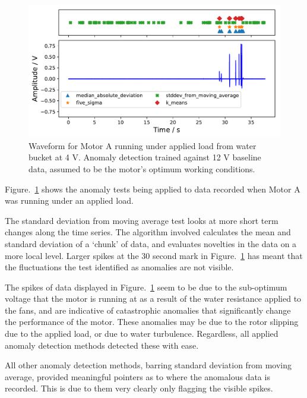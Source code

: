 \begin{figure}[t]
    \includegraphics[width=1.0\textwidth]{fig/large_4V-9A_water_large_12V.pdf}
    \caption[Anomaly Plot Large Motor under Load]{Waveform for Motor A running under applied load from water bucket at 4 V. Anomaly detection trained against 12 V baseline data, assumed to be the motor's optimum working conditions.}
    \label{fig:largemotor_water4V}
\end{figure}

Figure.~\ref{fig:largemotor_water4V} shows the anomaly tests being applied to data recorded when Motor A was running under an applied load.

The standard deviation from moving average test looks at more short term changes along the time series. The algorithm involved calculates the mean and standard deviation of a `chunk' of data, and evaluates novelties in the data on a more local level. Larger spikes at the 30 second mark in Figure.~\ref{fig:largemotor_water4V} has meant that the fluctuations the test identified as anomalies are not visible.

The spikes of data displayed in Figure.~\ref{fig:largemotor_water4V} seem to be due to the sub-optimum voltage that the motor is running at as a result of the water resistance applied to the fans, and are indicative of catastrophic anomalies that significantly change the performance of the motor. These anomalies may be due to the rotor slipping due to the applied load, or due to water turbulence. Regardless, all applied anomaly detection methods detected these with ease.

All other anomaly detection methods, barring standard deviation from moving average, provided meaningful pointers as to where the anomalous data is recorded. This is due to them very clearly only flagging the visible spikes.



